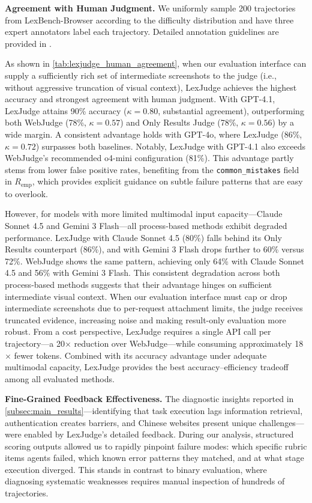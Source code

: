 \textbf{Agreement with Human Judgment.}
We uniformly sample 200 trajectories from LexBench-Browser according to the difficulty distribution and have three expert annotators label each trajectory. Detailed annotation guidelines are provided in .



As shown in \cref{tab:lexjudge_human_agreement}, when our evaluation interface can supply a sufficiently rich set of intermediate screenshots to the judge (i.e., without aggressive truncation of visual context), LexJudge achieves the highest accuracy and strongest agreement with human judgment. With GPT-4.1, LexJudge attains 90\% accuracy ($\kappa = 0.80$, substantial agreement), outperforming both WebJudge (78\%, $\kappa = 0.57$) and Only Results Judge (78\%, $\kappa = 0.56$) by a wide margin. A consistent advantage holds with GPT-4o, where LexJudge (86\%, $\kappa = 0.72$) surpasses both baselines. Notably, LexJudge with GPT-4.1 also exceeds WebJudge's recommended o4-mini configuration (81\%). This advantage partly stems from lower false positive rates, benefiting from the \texttt{common\_mistakes} field in $R_{\text{emp}}$, which provides explicit guidance on subtle failure patterns that are easy to overlook.

However, for models with more limited multimodal input capacity---Claude Sonnet 4.5 and Gemini 3 Flash---all process-based methods exhibit degraded performance. LexJudge with Claude Sonnet 4.5 (80\%) falls behind its Only Results counterpart (86\%), and with Gemini 3 Flash drops further to 60\% versus 72\%. WebJudge shows the same pattern, achieving only 64\% with Claude Sonnet 4.5 and 56\% with Gemini 3 Flash. This consistent degradation across both process-based methods suggests that their advantage hinges on sufficient intermediate visual context. When our evaluation interface must cap or drop intermediate screenshots due to per-request attachment limits, the judge receives truncated evidence, increasing noise and making result-only evaluation more robust. From a cost perspective, LexJudge requires a single API call per trajectory---a 20$\times$ reduction over WebJudge---while consuming approximately 18$\times$ fewer tokens. Combined with its accuracy advantage under adequate multimodal capacity, LexJudge provides the best accuracy--efficiency tradeoff among all evaluated methods.


\textbf{Fine-Grained Feedback Effectiveness.}
The diagnostic insights reported in \cref{subsec:main_results}---identifying that task execution lags information retrieval, authentication creates barriers, and Chinese websites present unique challenges---were enabled by LexJudge's detailed feedback. During our analysis, structured scoring outputs allowed us to rapidly pinpoint failure modes: which specific rubric items agents failed, which known error patterns they matched, and at what stage execution diverged. This stands in contrast to binary evaluation, where diagnosing systematic weaknesses requires manual inspection of hundreds of trajectories.

